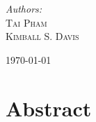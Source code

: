 \documentclass[11pt]{article}
\begin{document}
\begin{titlepage}
	
	{\Large\textit{Authors:}}\\
 	\Large\textsc{Tai Pham}\\
	 \Large\textsc{Kimball S. Davis} %
	
	
	\vfill\vfill\vfill %
	
	{\large\today} %
	
	
	 
	
	\vfill %
	
\end{titlepage}



\section*{Abstract}

\blindtext
\end{document}
